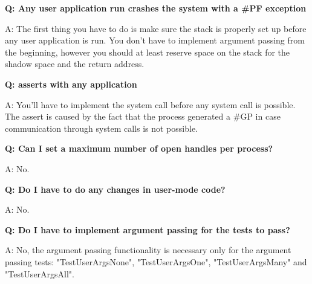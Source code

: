 \newline

\textbf{Q: Any user application run crashes the system with a \#PF exception}

A: The first thing you have to do is make sure the stack is properly set up before any user
application is run. You don't have to implement argument passing from the beginning, however you
should at least reserve space on the stack for the shadow space and the return address.

\newline

\textbf{Q: \projectname asserts with any application}

A: You'll have to implement the  system call before any system call
is possible. The assert is caused by the fact that the process generated a \#GP in case communication
through system calls is not possible.

\newline

\textbf{Q: Can I set a maximum number of open handles per process?}

A: No.

\newline

\textbf{Q: Do I have to do any changes in user-mode code?}

A: No.

\newline

\textbf{Q: Do I have to implement argument passing for the tests to pass?}

A: No, the argument passing functionality is necessary only for the argument passing tests: "TestUserArgsNone", "TestUserArgsOne", "TestUserArgsMany" and "TestUserArgsAll".